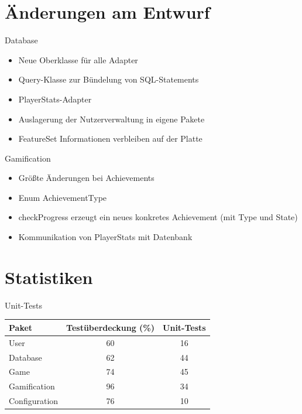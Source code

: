 \documentclass[xcolor=dvipsnames]{beamer}
\begin{document}
\section{Änderungen am Entwurf}
\begin{frame}{Database}
    \begin{itemize}
        \item Neue Oberklasse für alle Adapter
        \item Query-Klasse zur Bündelung von SQL-Statements
        \item PlayerStats-Adapter
        \item Auslagerung der Nutzerverwaltung in eigene Pakete
        \item FeatureSet Informationen verbleiben auf der Platte
    \end{itemize}
\end{frame}

\begin{frame}{Gamification}
  \begin{itemize}
     \item Größte Änderungen bei Achievements
     \item Enum AchievementType
     \item checkProgress erzeugt ein neues konkretes Achievement (mit Type und State)
     \item Kommunikation von PlayerStats mit Datenbank
  \end{itemize}
\end{frame}

\renewcommand{\arraystretch}{1.5}

\section{Statistiken}
\begin{frame}{Unit-Tests}
  \begin{center}
    \begin{tabular}{ | l | c | c | }
      \hline
      Paket & Testüberdeckung (\%) & Unit-Tests \\ \hline
      User & 60 & 16 \\
      Database & 62 & 44 \\
      Game & 74 & 45 \\
      Gamification & 96 & 34 \\
      Configuration & 76 & 10 \\
      \hline
    \end{tabular}
  \end{center}
\end{frame}
\end{document}
